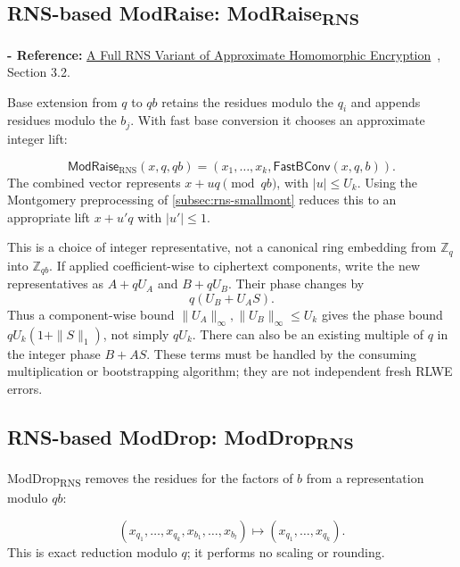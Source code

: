 \subsection{RNS-based ModRaise: \textsf{ModRaise\textsubscript{RNS}}}
\label{subsec:rns-modraise}

\noindent \textbf{- Reference:} \href{https://eprint.iacr.org/2018/931}{A Full RNS Variant of Approximate Homomorphic Encryption}~\cite{rns-ckks}, Section 3.2.

Base extension from $q$ to $qb$ retains the residues modulo the $q_i$ and appends residues modulo the $b_j$. With fast base conversion it chooses an approximate integer lift:
\begin{tcolorbox}[title={\textbf{\tboxlabel{\ref*{subsec:rns-modraise}} \textsf{ModRaise\textsubscript{RNS}}}}]
\[
\textsf{ModRaise}_{\mathrm{RNS}}(x,q,qb)
=(x_1,\ldots,x_k,\textsf{FastBConv}(x,q,b)).
\]
The combined vector represents $x+uq\pmod{qb}$, with $|u|\leq U_k$. Using the Montgomery preprocessing of \autoref{subsec:rns-smallmont} reduces this to an appropriate lift $x+u'q$ with $|u'|\leq1$.
\end{tcolorbox}

This is a choice of integer representative, not a canonical ring embedding from $\mathbb Z_q$ into $\mathbb Z_{qb}$. If applied coefficient-wise to ciphertext components, write the new representatives as $A+qU_A$ and $B+qU_B$. Their phase changes by
\[
q(U_B+U_AS).
\]
Thus a component-wise bound $\|U_A\|_\infty,\|U_B\|_\infty\leq U_k$ gives the phase bound $qU_k(1+\|S\|_1)$, not simply $qU_k$. There can also be an existing multiple of $q$ in the integer phase $B+AS$. These terms must be handled by the consuming multiplication or bootstrapping algorithm; they are not independent fresh RLWE errors.

\subsection{RNS-based ModDrop: \textsf{ModDrop\textsubscript{RNS}}}
\label{subsec:rns-moddrop}

\textsf{ModDrop\textsubscript{RNS}} removes the residues for the factors of $b$ from a representation modulo $qb$:
\begin{tcolorbox}[title={\textbf{\tboxlabel{\ref*{subsec:rns-moddrop}} \textsf{ModDrop\textsubscript{RNS}}}}]
\[
(x_{q_1},\ldots,x_{q_k},x_{b_1},\ldots,x_{b_l})
\longmapsto(x_{q_1},\ldots,x_{q_k}).
\]
This is exact reduction modulo $q$; it performs no scaling or rounding.
\end{tcolorbox}

